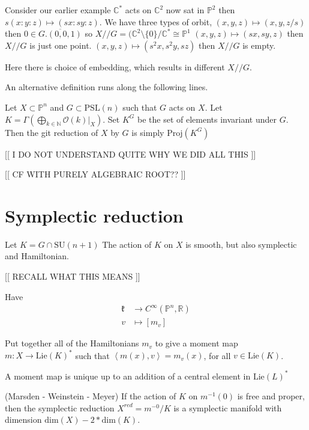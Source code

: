 Consider our earlier example $ \mathbb{C}  ^* $ acts on $ \mathbb{C} ^2 $ now sat in $ \mathbb{P} ^2$
then 
$s(x:y:z) \mapsto ( sx: sy: z) $. 
We have three types of orbit, 
$(x,y,z) \mapsto (x,y,z/s) $ then $ 0 \in \overline{G . ( 0,0,1) } $ so $ X// G = (\mathbb{C} ^2 \setminus \{0\} / \mathbb{C} ^* \cong \mathbb{P} ^1 $
$(x,y,z) \mapsto (sx,sy,z) $ then $ X// G $ is just one point.
$(x,y,z) \mapsto (s^2x,s^2 y, sz) $ then $ X// G $ is empty.

Here there is choice of embedding, which results in different $X//G$. 

An alternative definition runs along the following lines. 

Let $X \subset \mathbb{P} ^n $ and $ G \subset \mathrm{PSL} (n) $ such that $ G $ acts on $ X $.
Let $ K = \Gamma (\bigoplus_{k \in \mathbb{N} }  \mathcal{O}(k)|_X  ) $. 
Set $ K ^G $ be the set of elements invariant under $G$. 
Then the git reduction of $ X$ by $G$ is simply $ \mathrm{Proj}(K^G)$ 

[[ I DO NOT UNDERSTAND  QUITE WHY WE DID ALL THIS ]] 

[[ CF WITH PURELY ALGEBRAIC ROOT?? ]] 


\section{Symplectic reduction} %


Let $ K = G \cap \mathrm{SU}(n+1) $ 
The action of $ K $ on $ X$ is smooth, but also symplectic and Hamiltonian. 

[[ RECALL WHAT THIS MEANS ]]

Have 
\begin{align}
    \mathfrak{k} & \rightarrow  C^\infty ( \mathbb{P} ^n , \mathbb{R} ) \\
    v & \mapsto [ m_v] 
\end{align}

Put together all of the Hamiltonians $ m_v $ to give a moment map $ m : X \rightarrow  \mathrm{Lie}(K) ^* $
such that $\left< m(x) , v \right> = m_v(x) $, for all $ v \in \mathrm{Lie} (K) $. 

A moment map is unique up to an addition of a central element in $\mathrm{Lie} (L) ^*$ 

\begin{theorem}
    (Marsden - Weinstein - Meyer) 
    If the action of $K$ on $m^{-1}(0) $ is free and proper, 
    then the symplectic reduction $ X ^{red} = m^{-0} /K $ 
    is a symplectic manifold with dimension $ \mathrm{dim}(X) - 2 * \mathrm{dim}(K) $. 
\end{theorem}


